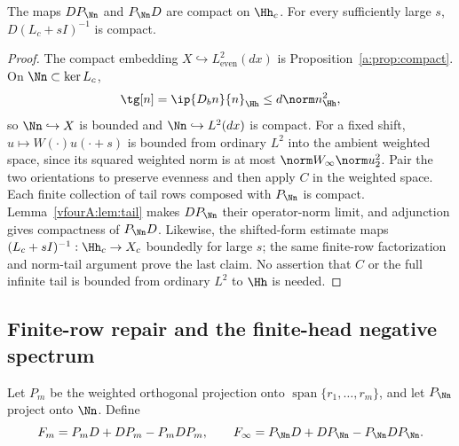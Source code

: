 \begin{lemma}\label{vfourA:lem:compact-rows}
The maps $DP_\Nn$ and $P_\Nn D$ are compact on $\Hh_c$.
For every sufficiently large $s$, $D(L_c+sI)^{-1}$ is compact.
\end{lemma}
\begin{proof}
The compact embedding $X\hookrightarrow L^2_{\mathrm{even}}(dx)$
is Proposition~\ref{a:prop:compact}.  On $\Nn\subset\ker L_c$,
\[
 \tg[n]=\ip{D_bn}{n}_{\Hh}\le d\norm n_{\Hh}^2,
\]
so $\Nn\hookrightarrow X$ is bounded and
$\Nn\hookrightarrow L^2(dx)$ is compact.  For a fixed shift,
$u\mapsto W(\cdot)u(\cdot+s)$ is bounded from ordinary $L^2$ into
the ambient weighted space, since its squared weighted norm is at
most $\norm W_\infty\norm u_2^2$.  Pair the two orientations to
preserve evenness and then apply $C$ in the weighted space.
Each finite collection of tail rows composed with $P_\Nn$ is
compact.  Lemma~\ref{vfourA:lem:tail} makes $DP_\Nn$ their operator-norm
limit, and adjunction gives compactness of $P_\Nn D$.
Likewise, the shifted-form estimate maps
$(L_c+sI)^{-1}:\Hh_c\to X_c$ boundedly for large $s$; the same
finite-row factorization and norm-tail argument prove the last claim.
No assertion that $C$ or the full infinite tail is bounded from
ordinary $L^2$ to $\Hh$ is needed.
\end{proof}

\subsection{Finite-row repair and the finite-head negative spectrum}
\label{vfourA:subsec:repair}

Let $P_m$ be the weighted orthogonal projection onto
$\operatorname{span}\{r_1,\ldots,r_m\}$, and let $P_\Nn$ project onto
$\Nn$.  Define
\begin{equation}\label{vfourA:eq:repairs}
 F_m=P_mD+DP_m-P_mDP_m,\qquad
 F_\infty=P_\Nn D+DP_\Nn-P_\Nn DP_\Nn.
\end{equation}

